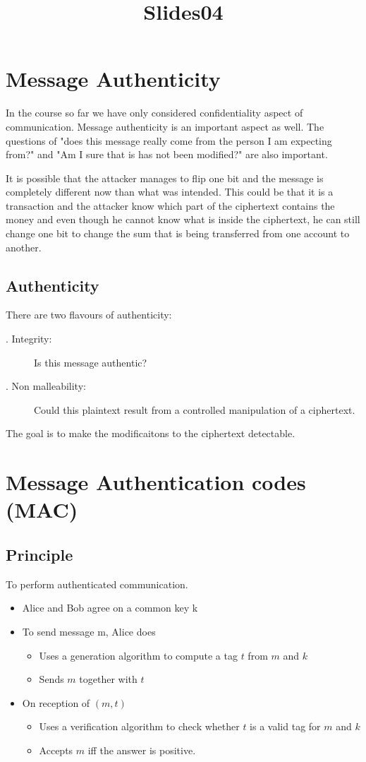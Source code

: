 \documentclass[12pt]{article}
\title{Slides04}
\begin{document}
\maketitle
\tableofcontents
\newpage

\section{Message Authenticity}
In the course so far we have only considered confidentiality aspect of communication. Message authenticity is an important aspect as well. The questions of "does this message really come from the person I am expecting from?" and "Am I sure that is has not been modified?" are also important.

It is possible that the attacker manages to flip one bit and the message is completely different now than what was intended. This could be that it is a transaction and the attacker know which part of the ciphertext contains the money and even though he cannot know what is inside the ciphertext, he can still change one bit to change the sum that is being transferred from one account to another.

\subsection{Authenticity}
There are two flavours of authenticity:
\begin{description}
\item[. Integrity:] Is this message authentic?
\item [. Non malleability:] Could this plaintext result from a controlled manipulation of a ciphertext.
\end{description}

The goal is to make the modificaitons to the ciphertext detectable.

\section{Message Authentication codes (MAC)}
\subsection{Principle}
To perform authenticated communication.
\begin{itemize}
\item Alice and Bob agree on a common key k
\item To send message m, Alice does
	\begin{itemize}
	\item Uses a generation algorithm to compute a tag $t$ from $m$ and $k$
	\item Sends $m$ together with $t$
	\end{itemize}
\item On reception of $(m,t)$
	\begin{itemize}
	\item Uses a verification algorithm to check whether $t$ is a valid tag for $m$ and $k$
	\item Accepts $m$ iff the answer is positive.
	\end{itemize}
\end{itemize}
\newpage
\end{document}
